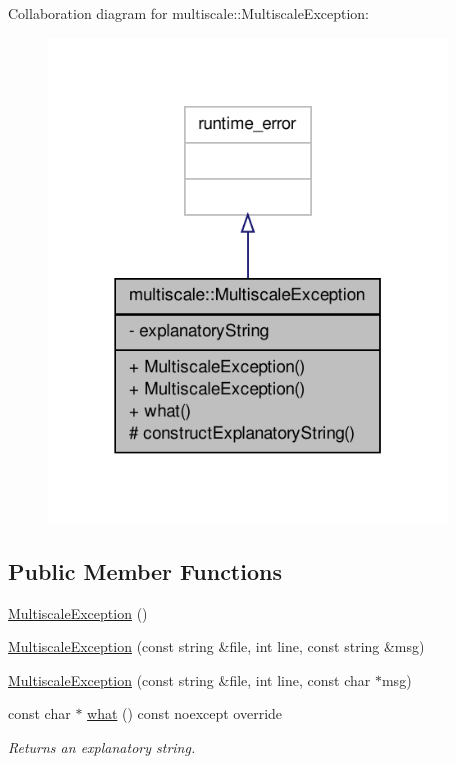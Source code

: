 \-Collaboration diagram for multiscale\-:\-:\-Multiscale\-Exception\-:
\nopagebreak
\begin{figure}[H]
\begin{center}
\leavevmode
\includegraphics[width=300pt]{classmultiscale_1_1MultiscaleException__coll__graph}
\end{center}
\end{figure}
\subsection*{\-Public \-Member \-Functions}
\begin{DoxyCompactItemize}
\item 
\hyperlink{classmultiscale_1_1MultiscaleException_a12ea1d81690b812c46bc58b966732e1b}{\-Multiscale\-Exception} ()
\item 
\hyperlink{classmultiscale_1_1MultiscaleException_a6eb7d129f239cc1c4f497b1bbaf94fa5}{\-Multiscale\-Exception} (const string \&file, int line, const string \&msg)
\item 
\hyperlink{classmultiscale_1_1MultiscaleException_a3c0023538ce22fcd663b98a39b12d5a5}{\-Multiscale\-Exception} (const string \&file, int line, const char $\ast$msg)
\item 
const char $\ast$ \hyperlink{classmultiscale_1_1MultiscaleException_a1af231f6e68715087f5be6e4000e8409}{what} () const noexcept override
\begin{DoxyCompactList}\small\item\em \-Returns an explanatory string. \end{DoxyCompactList}\end{DoxyCompactItemize}
